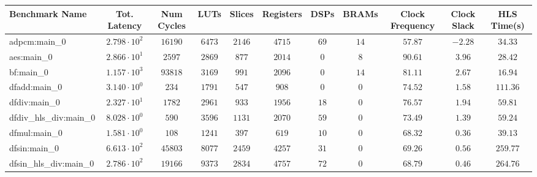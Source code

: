 \begin{tabular}{|l|c|c|c|c|c|c|c|c|c|c|}
\hline
Benchmark Name          & Tot. Latency           & Num Cycles & LUTs      & Slices    & Registers & DSPs    & BRAMs   & Clock Frequency & Clock Slack & HLS Time(s) \\
\hline
adpcm:main\_0           & $ 2.798 \cdot 10^{2} $ & $ 16190  $ & $ 6473  $ & $ 2146  $ & $ 4715  $ & $ 69  $ & $ 14  $ & $ 57.87       $ & $ -2.28   $ & $ 34.33   $ \\
aes:main\_0             & $ 2.866 \cdot 10^{1} $ & $ 2597   $ & $ 2869  $ & $ 877   $ & $ 2014  $ & $ 0   $ & $ 8   $ & $ 90.61       $ & $ 3.96    $ & $ 28.42   $ \\
bf:main\_0              & $ 1.157 \cdot 10^{3} $ & $ 93818  $ & $ 3169  $ & $ 991   $ & $ 2096  $ & $ 0   $ & $ 14  $ & $ 81.11       $ & $ 2.67    $ & $ 16.94   $ \\
dfadd:main\_0           & $ 3.140 \cdot 10^{0} $ & $ 234    $ & $ 1791  $ & $ 547   $ & $ 908   $ & $ 0   $ & $ 0   $ & $ 74.52       $ & $ 1.58    $ & $ 111.36  $ \\
dfdiv:main\_0           & $ 2.327 \cdot 10^{1} $ & $ 1782   $ & $ 2961  $ & $ 933   $ & $ 1956  $ & $ 18  $ & $ 0   $ & $ 76.57       $ & $ 1.94    $ & $ 59.81   $ \\
dfdiv\_hls\_div:main\_0 & $ 8.028 \cdot 10^{0} $ & $ 590    $ & $ 3596  $ & $ 1131  $ & $ 2070  $ & $ 59  $ & $ 0   $ & $ 73.49       $ & $ 1.39    $ & $ 59.24   $ \\
dfmul:main\_0           & $ 1.581 \cdot 10^{0} $ & $ 108    $ & $ 1241  $ & $ 397   $ & $ 619   $ & $ 10  $ & $ 0   $ & $ 68.32       $ & $ 0.36    $ & $ 39.13   $ \\
dfsin:main\_0           & $ 6.613 \cdot 10^{2} $ & $ 45803  $ & $ 8077  $ & $ 2459  $ & $ 4257  $ & $ 31  $ & $ 0   $ & $ 69.26       $ & $ 0.56    $ & $ 259.77  $ \\
dfsin\_hls\_div:main\_0 & $ 2.786 \cdot 10^{2} $ & $ 19166  $ & $ 9373  $ & $ 2834  $ & $ 4757  $ & $ 72  $ & $ 0   $ & $ 68.79       $ & $ 0.46    $ & $ 264.76  $ \\

\end{tabular}
